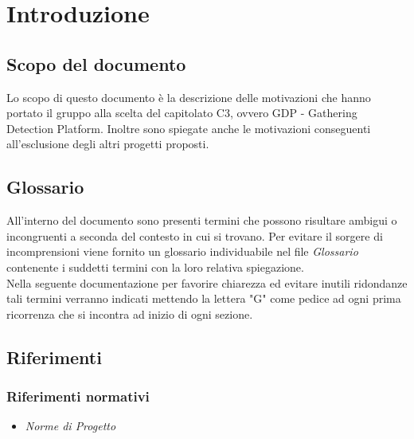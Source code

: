 \chapter{Introduzione}

\section{Scopo del documento}
Lo scopo di questo documento è la descrizione delle motivazioni che hanno portato il gruppo alla scelta del capitolato C3, ovvero GDP - Gathering Detection Platform. Inoltre sono spiegate anche le motivazioni conseguenti all'esclusione degli altri progetti proposti.

\section{Glossario}
All'interno del documento sono presenti termini che possono risultare ambigui o incongruenti a seconda del contesto in cui si trovano. Per evitare il sorgere di incomprensioni viene fornito un glossario individuabile nel file \textit{Glossario} contenente i suddetti termini con la loro relativa spiegazione.
\\Nella seguente documentazione per favorire chiarezza ed evitare inutili ridondanze tali termini verranno indicati mettendo la lettera "G" come pedice ad ogni prima ricorrenza che si incontra ad inizio di ogni sezione.

\section{Riferimenti}
\subsection{Riferimenti normativi}
\begin{itemize}
	\item \textit{Norme di Progetto}
\end{itemize}
